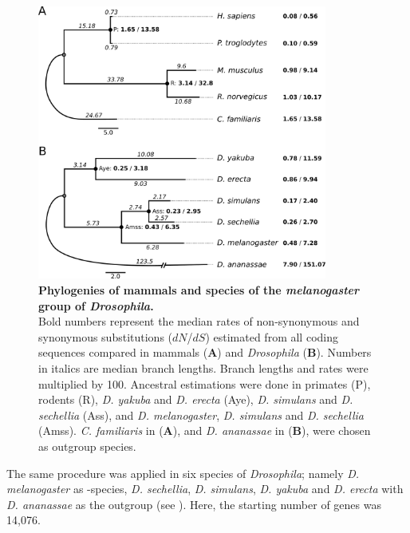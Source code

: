 \begin{figure}[!ht] 
\centering 
\includegraphics[width=0.85\textwidth]{figures/material_methods/phylogenies.pdf}
\caption[Phylogenies of mammals and species of the \textit{melanogaster} group of \textit{Drosophila}]{
  {\bf Phylogenies of mammals and species of the \textit{melanogaster} group of \textit{Drosophila}.}\\ %
  Bold numbers represent the median rates of non-synonymous and synonymous substitutions ($dN$/$dS$) estimated from all coding sequences compared in mammals (\textbf{A}) and \textit{Drosophila} (\textbf{B}). Numbers in italics are median branch lengths. Branch lengths and rates were multiplied by 100. Ancestral estimations were done in primates (P), rodents (R), \textit{D. yakuba} and \textit{D. erecta} (Aye), \textit{D. simulans} and \textit{D. sechellia} (Ass), and \textit{D. melanogaster}, \textit{D. simulans} and \textit{D. sechellia} (Amss). \textit{C. familiaris} in (\textbf{A}), and \textit{D. ananassae} in (\textbf{B}), were chosen as outgroup species.} 
\label{fig:phylogeny}
\end{figure}

The same procedure was applied in six species of \textit{Drosophila}; namely \textit{D. melanogaster} as -species, \textit{D. sechellia}, \textit{D. simulans}, \textit{D. yakuba} and \textit{D. erecta} with \textit{D. ananassae} as the outgroup (see ). Here, the starting number of  genes was 14,076.

